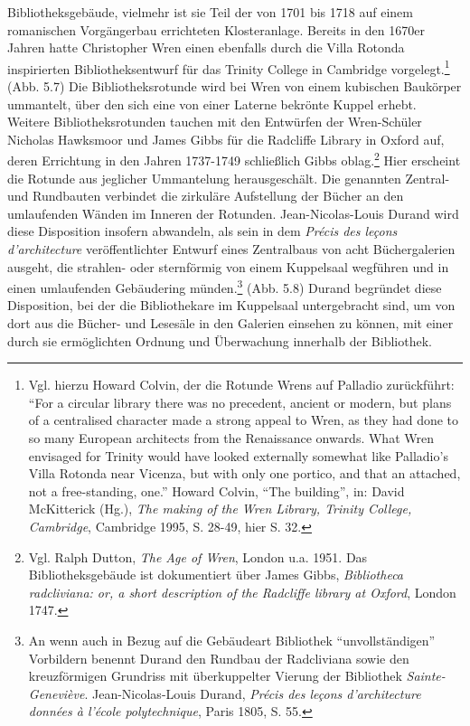 Bibliotheksgebäude, vielmehr ist sie Teil der von 1701 bis 1718 auf
einem romanischen Vorgängerbau errichteten Klosteranlage. Bereits in den
1670er Jahren hatte Christopher Wren einen ebenfalls durch die Villa
Rotonda inspirierten Bibliotheksentwurf für das Trinity College in
Cambridge vorgelegt.\footnote{Vgl. hierzu Howard Colvin, der die Rotunde
  Wrens auf Palladio zurückführt: \enquote{For a circular library there
  was no precedent, ancient or modern, but plans of a centralised
  character made a strong appeal to Wren, as they had done to so many
  European architects from the Renaissance onwards. What Wren envisaged
  for Trinity would have looked externally somewhat like Palladio's
  Villa Rotonda near Vicenza, but with only one portico, and that an
  attached, not a free-standing, one.} Howard Colvin, \enquote{The
  building}, in: David McKitterick (Hg.), \emph{The making of the Wren
  Library, Trinity College, Cambridge}, Cambridge 1995, S. 28-49, hier
  S. 32.} (Abb. 5.7) Die Bibliotheksrotunde wird bei Wren von einem
kubischen Baukörper ummantelt, über den sich eine von einer Laterne
bekrönte Kuppel erhebt. Weitere Bibliotheksrotunden tauchen mit den
Entwürfen der Wren-Schüler Nicholas Hawksmoor und James Gibbs für die
Radcliffe Library in Oxford auf, deren Errichtung in den Jahren
1737-1749 schließlich Gibbs oblag.\footnote{Vgl. Ralph Dutton, \emph{The
  Age of Wren}, London u.a. 1951. Das Bibliotheksgebäude ist
  dokumentiert über James Gibbs, \emph{Bibliotheca radcliviana: or, a
  short description of the Radcliffe library at Oxford}, London 1747.}
Hier erscheint die Rotunde aus jeglicher Ummantelung herausgeschält. Die
genannten Zentral- und Rundbauten verbindet die zirkuläre Aufstellung
der Bücher an den umlaufenden Wänden im Inneren der Rotunden.
Jean-Nicolas-Louis Durand wird diese Disposition insofern abwandeln, als
sein in dem \emph{Précis des leçons d'architecture} veröffentlichter
Entwurf eines Zentralbaus von acht Büchergalerien ausgeht, die strahlen-
oder sternförmig von einem Kuppelsaal wegführen und in einen umlaufenden
Gebäudering münden.\footnote{An wenn auch in Bezug auf die Gebäudeart
  Bibliothek \enquote{unvollständigen} Vorbildern benennt Durand den
  Rundbau der Radcliviana sowie den kreuzförmigen Grundriss mit
  überkuppelter Vierung der Bibliothek \emph{Sainte-Geneviève}.
  Jean-Nicolas-Louis Durand, \emph{Précis des leçons d'architecture
  données à l'école polytechnique}, Paris 1805, S. 55.} (Abb. 5.8) Durand
begründet diese Disposition, bei der die Bibliothekare im Kuppelsaal
untergebracht sind, um von dort aus die Bücher- und Lesesäle in den
Galerien einsehen zu können, mit einer durch sie ermöglichten Ordnung
und Überwachung innerhalb der Bibliothek.

